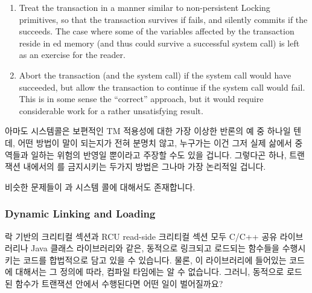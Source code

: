 \begin{enumerate}
\item	Treat the transaction in a manner similar to non-persistent
	Locking primitives, so that the transaction survives if 
	fails, and silently commits if the  succeeds.
	The case where some of the variables affected by the transaction
	reside in ed memory (and thus could survive a successful
	 system call) is left as an exercise for the reader.
\item	Abort the transaction (and the  system call) if the
	 system call would have succeeded, but allow the
	transaction to continue if the  system call would
	fail.
	This is in some sense the ``correct'' approach, but it would
	require considerable work for a rather unsatisfying result.
\fi
\end{enumerate}

아마도  시스템콜은 보편적인 TM 적용성에 대한 가장 이상한 반론의 예
중 하나일 텐데, 어떤 방법이 말이 되는지가 전혀 분명치 않고, 누구가는 이건 그저
실제 삶에서 중역들과 일하는 위험의 반영일 뿐이라고 주장할 수도 있을 겁니다.
그렇다곤 하나, 트랜잭션 내에서의  를 금지시키는 두가지 방법은 그나마
가장 논리적일 겁니다.

비슷한 문제들이  과  시스템 콜에 대해서도 존재합니다.

\subsubsection{Dynamic Linking and Loading}
\label{sec:future:Dynamic Linking and Loading}

락 기반의 크리티컬 섹션과 RCU read-side 크리티컬 섹션 모두 C/C++ 공유
라이브러리나 Java 클래스 라이브러리와 같은, 동적으로 링크되고 로드되는 함수들을
수행시키는 코드를 합법적으로 담고 있을 수 있습니다.
물론, 이 라이브러리에 들어있는 코드에 대해서는 그 정의에 따라, 컴파일 타임에는
알 수 없습니다.
그러니, 동적으로 로드된 함수가 트랜잭션 안에서 수행된다면 어떤 일이 벌어질까요?

